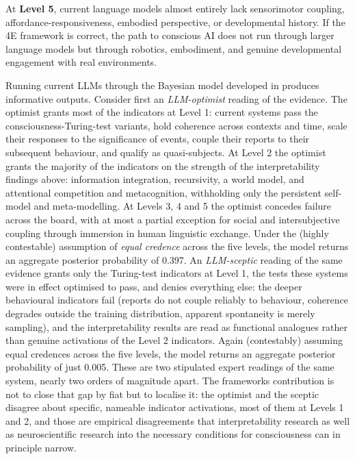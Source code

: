 \documentclass[11pt, a4paper, onecolumn, gdm]{google}
\begin{document}
At \textbf{Level 5}, current language models almost entirely lack sensorimotor coupling, affordance-responsiveness, embodied perspective, or developmental history.
If the 4E framework is correct, the path to conscious AI does not run through larger language models but through robotics, embodiment, and genuine developmental engagement with real environments.

Running current LLMs through the Bayesian model developed in  produces informative outputs.
Consider first an \emph{LLM-optimist} reading of the evidence.
The optimist grants most of the indicators at Level 1: current systems pass the consciousness-Turing-test variants, hold coherence across contexts and time, scale their responses to the significance of events, couple their reports to their subsequent behaviour, and qualify as quasi-subjects.
At Level 2 the optimist grants the majority of the indicators on the strength of the interpretability findings above: information integration, recursivity, a world model, and attentional competition and metacognition, withholding only the persistent self-model and meta-modelling.
At Levels 3, 4 and 5 the optimist concedes failure across the board, with at most a partial exception for social and intersubjective coupling through immersion in human linguistic exchange.
Under the (highly contestable) assumption of \emph{equal credence} across the five levels, the model returns an aggregate posterior probability of 0.397.
An \emph{LLM-sceptic} reading of the same evidence grants only the Turing-test indicators at Level 1, the tests these systems were in effect optimised to pass, and denies everything else: the deeper behavioural indicators fail (reports do not couple reliably to behaviour, coherence degrades outside the training distribution, apparent spontaneity is merely sampling), and the interpretability results are read as functional analogues rather than genuine activations of the Level 2 indicators.
Again (contestably) assuming equal credences across the five levels, the model returns an aggregate posterior probability of just 0.005.
These are two stipulated expert readings of the same system, nearly two orders of magnitude apart.
The framework\textquotesingle s contribution is not to close that gap by fiat but to localise it: the optimist and the sceptic disagree about specific, nameable indicator activations, most of them at Levels 1 and 2, and those are empirical disagreements that interpretability research as well as neuroscientific research into the necessary conditions for consciousness can in principle narrow.
\end{document}
